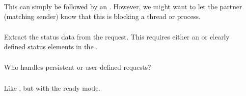 \documentclass{article}
\begin{document}
\subsubsection{}
This can simply be  followed by an .  However,
we might want to let the partner (matching sender) know that this is blocking
a thread or process.  

\subsubsection{}
\begin{adi3}
\begin{mmadi}
\begin{core}
\end{core}
\end{mmadi}
\end{adi3}

\subsubsection{}
Extract the status data from the request.
This requires either an  or clearly defined
status elements in the .

\subsubsection{}
\begin{adi3}
\begin{mmadi}
\begin{core}
\end{core}
\end{mmadi}
\end{adi3}
Who handles persistent or user-defined requests?

\subsubsection{}
Like , but with the ready mode.

\subsubsection{}

\subsubsection{}
\end{document}
